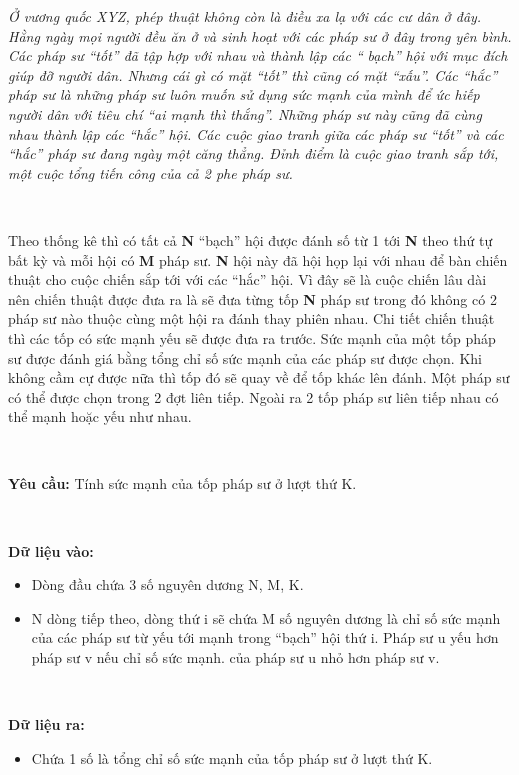 

\emph{Ở vương quốc XYZ, phép thuật không còn là điều xa lạ với các cư dân ở đây. Hằng ngày mọi người đều ăn ở và sinh hoạt với các pháp sư ở đây trong yên bình. Các pháp sư “tốt” đã tập hợp với nhau và thành lập các “ }\emph{ bạch” }\emph{ hội với mục đích giúp đỡ người dân. Nhưng cái gì có mặt “tốt” thì cũng có mặt “xấu”. Các “hắc” pháp sư là những pháp sư luôn muốn sử dụng sức mạnh của mình để ức hiếp người dân với tiêu chí “ai mạnh thì thắng”. Những pháp sư này cũng đã cùng nhau thành lập các “hắc” hội. Các cuộc giao tranh giữa các pháp sư “tốt” và các “hắc” pháp sư đang ngày một căng thẳng. Đỉnh điểm }\emph{ là cuộc giao tranh sắp tới, một cuộc tổng tiến công của cả 2 phe pháp sư. }

 

Theo thống kê thì có tất cả \textbf{ N } “bạch” hội được đánh số từ 1 tới \textbf{ N } theo thứ tự bất kỳ và mỗi hội có \textbf{ M } pháp sư. \textbf{ N } hội này đã hội họp lại với nhau để bàn chiến thuật cho cuộc chiến sắp tới với các “hắc” hội. Vì đây sẽ là cuộc chiến lâu dài nên chiến thuật được đưa ra là sẽ đưa từng tốp \textbf{ N } pháp sư trong đó không có 2 pháp sư nào thuộc cùng một hội ra đánh thay phiên nhau. Chi tiết chiến thuật thì các tốp có sức mạnh yếu sẽ được đưa ra trước. Sức mạnh của một tốp pháp sư được đánh giá bằng tổng chỉ số sức mạnh của các pháp sư được chọn. Khi không cầm cự được nữa thì tốp đó sẽ quay về để tốp khác lên đánh. Một pháp sư có thể được chọn trong 2 đợt liên tiếp. Ngoài ra 2 tốp pháp sư liên tiếp nhau có thể mạnh hoặc yếu như nhau.

 

\textbf{Yêu cầu: } Tính sức mạnh của tốp pháp sư ở lượt thứ K.

 

\textbf{Dữ liệu vào: }
\begin{itemize}
	\item 

Dòng đầu chứa 3 số nguyên dương N, M, K.
	\item 

N dòng tiếp theo, dòng thứ i sẽ chứa M số nguyên dương là chỉ số sức mạnh của các pháp sư từ yếu tới mạnh trong “bạch” hội thứ i. Pháp sư u yếu hơn pháp sư v nếu chỉ số sức mạnh. của pháp sư u nhỏ hơn pháp sư v.
\end{itemize}

 

\textbf{Dữ liệu ra: }
\begin{itemize}
	\item 

Chứa 1 số là tổng chỉ số sức mạnh của tốp pháp sư ở lượt thứ K.
\end{itemize}

